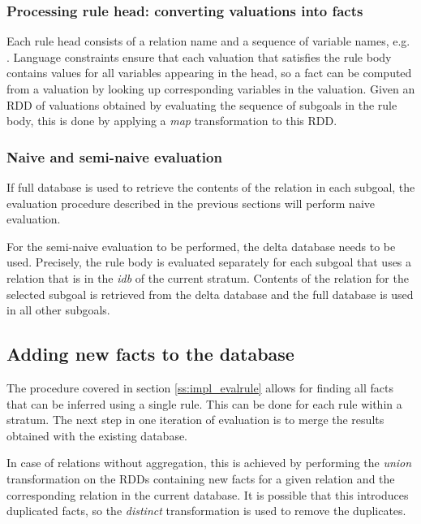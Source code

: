 \subsubsection{Processing rule head: converting valuations into facts}

Each rule head consists of a relation name and a sequence of variable names, e.g. . Language constraints ensure that each valuation that satisfies the rule body contains values for all variables appearing in the head, so a fact can be computed from a valuation by looking up corresponding variables in the valuation. Given an RDD of valuations obtained by evaluating the sequence of subgoals in the rule body, this is done by applying a \emph{map} transformation to this RDD.

\subsubsection{Naive and semi-naive evaluation}
If full database is used to retrieve the contents of the relation in each subgoal, the evaluation procedure described in the previous sections will perform naive evaluation.

For the semi-naive evaluation to be performed, the delta database needs to be used. Precisely, the rule body is evaluated separately for each subgoal that uses a relation that is in the \emph{idb} of the current stratum. Contents of the relation for the selected subgoal is retrieved from the delta database and the full database is used in all other subgoals.

\subsection{Adding new facts to the database}\label{ss:impl_merge}

The procedure covered in section \ref{ss:impl_evalrule} allows for finding all facts that can be inferred using a single rule. This can be done for each rule within a stratum. The next step in one iteration of evaluation is to merge the results obtained with the existing database.

In case of relations without aggregation, this is achieved by performing the \emph{union} transformation on the RDDs containing new facts for a given relation and the corresponding relation in the current database. It is possible that this introduces duplicated facts, so the \emph{distinct} transformation is used to remove the duplicates.

